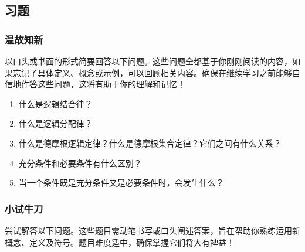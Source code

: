 \subsection{习题}

\subsubsection*{温故知新}

以口头或书面的形式简要回答以下问题。这些问题全都基于你刚刚阅读的内容，如果忘记了具体定义、概念或示例，可以回顾相关内容。确保在继续学习之前能够自信地作答这些问题，这将有助于你的理解和记忆！

\begin{enumerate}[label=(\arabic*)]
    \item 什么是逻辑结合律？
    \item 什么是逻辑分配律？
    \item 什么是德摩根逻辑定律？什么是德摩根集合定律？它们之间有什么关系？
    \item 充分条件和必要条件有什么区别？
    \item 当一个条件既是充分条件又是必要条件时，会发生什么？
\end{enumerate}

\subsubsection*{小试牛刀}

尝试解答以下问题。这些题目需动笔书写或口头阐述答案，旨在帮助你熟练运用新概念、定义及符号。题目难度适中，确保掌握它们将大有裨益！

